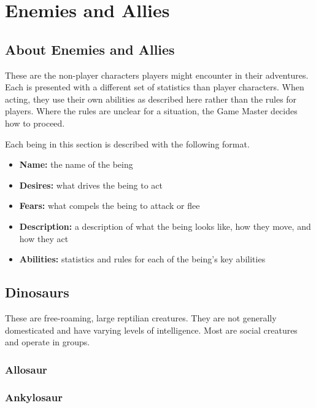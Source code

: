 \chapter{Enemies and Allies}

\begin{multicols}{2}

\section{About Enemies and Allies}

These are the non-player characters players might encounter in
their adventures. Each is presented with a different set of
statistics than player characters. When acting, they use their
own abilities as described here rather than the rules for players.
Where the rules are unclear for a situation, the Game Master decides
how to proceed.

Each being in this section is described with the following format.

\begin{itemize}
  \item \textbf{Name:} the name of the being
  \item \textbf{Desires:} what drives the being to act
  \item \textbf{Fears:} what compels the being to attack or flee
  \item \textbf{Description:} a description of what the being looks like, how they move, and how they act
  \item \textbf{Abilities:} statistics and rules for each of the being's key abilities
\end{itemize}

\section{Dinosaurs}

These are free-roaming, large reptilian creatures. They
are not generally domesticated and have varying levels
of intelligence. Most are social creatures and operate in
groups.

\subsection{Allosaur}

\subsection{Ankylosaur}


\end{multicols}
